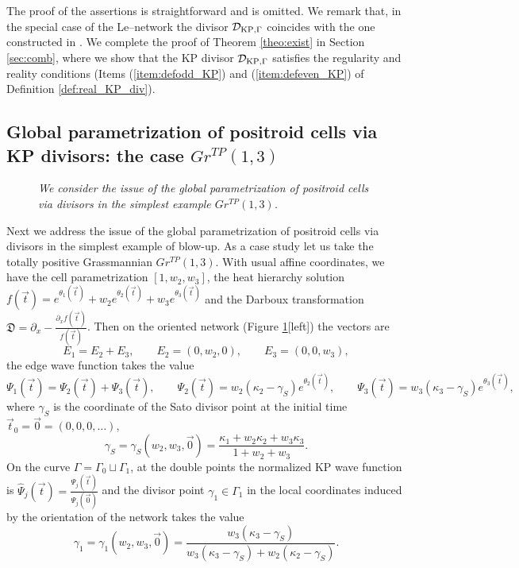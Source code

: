 \documentclass[11pt]{amsart}
\theoremstyle{plain}
\numberwithin{equation}{section}
\def \DKP {{\mathcal D}_{\textup{\scriptsize KP},\Gamma}}
\begin{document}
The proof of the assertions is straightforward and is omitted. We remark that, in the special case of the Le--network the divisor $\DKP$ coincides with the one constructed in \cite{AG3}.
We complete the proof of Theorem \ref{theo:exist} in Section \ref{sec:comb}, where we show that
the KP divisor $\DKP$ satisfies the regularity and reality conditions (Items (\ref{item:defodd_KP}) and (\ref{item:defeven_KP}) of Definition \ref{def:real_KP_div}).

\subsection{Global parametrization of positroid cells via KP divisors: the case $Gr^{TP}(1,3)$}\label{sec:global}
\begin{figure}%
	\vspace{-1.7 truecm}
  \caption{\small{\sl We consider the issue of the global parametrization of positroid cells via divisors in the simplest example $Gr^{TP}(1,3)$.}\label{fig:global}}
\end{figure}
Next we address the issue of the global parametrization of positroid cells via divisors in the simplest example of blow-up. As a case study let us take the totally positive Grassmannian $Gr^{TP} (1,3)$.
With usual affine coordinates, we have the cell parametrization $[1,w_2,w_3]$, the heat hierarchy solution $f(\vec t)= e^{\theta_1 (\vec t)}+w_2 e^{\theta_2 (\vec t)}+w_3 e^{\theta_3 (\vec t)}$ and the Darboux transformation ${\mathfrak D}=\partial_x -\frac{\partial_x f(\vec t)}{f(\vec t)}$. 
Then on the oriented network (Figure \ref{fig:global}[left]) the vectors are 
\[
E_1 =E_2+E_3, \quad\quad E_2 =(0,w_2,0), \quad\quad E_3 =(0,0,w_3),
\]
the edge wave function takes the value
\[
\Psi_1 (\vec t) =\Psi_2(\vec t)+\Psi_3(\vec t), \quad\quad \Psi_2(\vec t) =w_2 (\kappa_2-\gamma_S) e^{\theta_2(\vec t)}, \quad\quad \Psi_3(\vec t) =w_3 (\kappa_3-\gamma_S) e^{\theta_3(\vec t)},
\]
where $\gamma_S$ is the coordinate of the Sato divisor point at the initial time $\vec t_0=\vec 0=(0,0,0,\dots)$,
\[
\gamma_S= \gamma_S (w_2,w_3,\vec 0)= \frac{\kappa_1 +w_2 \kappa_2 + w_3 \kappa_3}{1 +w_2  + w_3 }.
\]
On the curve $\Gamma=\Gamma_0\sqcup\Gamma_1$, at the double points the normalized KP wave function is $\hat \Psi_j(\vec t) =\frac{\Psi_j(\vec t)}{\Psi_j(\vec 0)}$ and the divisor point $\gamma_1 \in \Gamma_1$ in the local coordinates induced by the orientation of the network takes the value
\[
\gamma_1 = \gamma_1 (w_2,w_3,\vec 0)= \frac{w_3(\kappa_3-\gamma_S)}{w_3(\kappa_3-\gamma_S)+w_2(\kappa_2-\gamma_S)}.
\]
\end{document}
